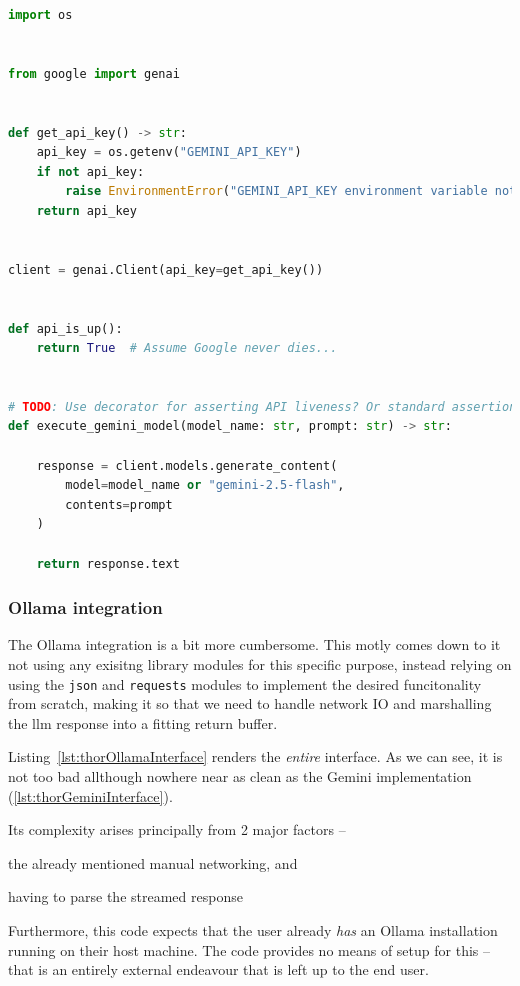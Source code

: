 \begin{lstlisting}[caption={llm\_api\_interfaces/gemini\_interface.py, The implementation of a Gemini interface for executing prompts.}, label={lst:thorGeminiInterface}, language={Python}]
import os


from google import genai


def get_api_key() -> str:
    api_key = os.getenv("GEMINI_API_KEY")
    if not api_key:
        raise EnvironmentError("GEMINI_API_KEY environment variable not set.")
    return api_key


client = genai.Client(api_key=get_api_key())


def api_is_up():
    return True  # Assume Google never dies...


# TODO: Use decorator for asserting API liveness? Or standard assertion??
def execute_gemini_model(model_name: str, prompt: str) -> str:

    response = client.models.generate_content(
        model=model_name or "gemini-2.5-flash",
        contents=prompt
    )

    return response.text
\end{lstlisting}

\subsubsection{Ollama integration}

The Ollama integration is a bit more cumbersome. This motly comes down to it not
using any exisitng library modules for this specific purpose, instead relying on
using the \texttt{json} and \texttt{requests} modules to implement the desired
funcitonality from scratch, making it so that we need to handle network IO and
marshalling the \acrfull{llm} response into a fitting return buffer.

Listing~\ref{lst:thorOllamaInterface} renders the
\emph{entire} interface. As we can see, it is not too bad allthough nowhere near
as clean as the Gemini implementation (\ref{lst:thorGeminiInterface}).

Its complexity arises principally from \num{2} major factors --
\begin{inparaenum}
    \item the already mentioned manual networking, and
    \item having to parse the streamed response
\end{inparaenum}
Furthermore, this code expects that the user already \emph{has} an Ollama
installation running on their host machine. The code provides no means of setup
for this -- that is an entirely external endeavour that is left up to the end user.

